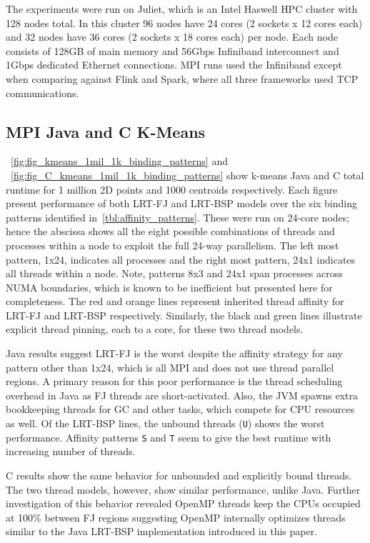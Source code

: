 \documentclass[10pt, conference, compsocconf]{IEEEtran}
\begin{document}
The experiments were run on Juliet, which is an Intel Haswell \ac{HPC} cluster with 128 nodes total. In this cluster 96 nodes have 24 cores (2 sockets x 12 cores each) and 32 nodes have 36 cores (2 sockets x 18 cores each) per node. Each node consists of 128GB of main memory and 56Gbps Infiniband interconnect and 1Gbps dedicated Ethernet connections. \ac{MPI} runs used the Infiniband except when comparing against Flink and Spark, where all three frameworks used \ac{TCP} communications.

\subsection{MPI Java and C K-Means}
\figurename~\ref{fig:fig_kmeans_1mil_1k_binding_patterns} and \figurename~\ref{fig:fig_C_kmeans_1mil_1k_binding_patterns} show k-means Java and C total runtime for 1 million 2D points and 1000 centroids respectively. Each figure present performance of both \ac{LRT-FJ} and \ac{LRT-BSP} models over the six binding patterns identified in~\ref{tbl:affinity_patterns}. These were run on 24-core nodes; hence the abscissa shows all the eight possible combinations of threads and processes within a node to exploit the full 24-way parallelism. The left most pattern, 1x24, indicates all processes and the right most pattern, 24x1 indicates all threads within a node. Note, patterns 8x3 and 24x1 span processes across \ac{NUMA} boundaries, which is known to be inefficient but presented here for completeness. The red and orange lines represent inherited thread affinity for \ac{LRT-FJ} and \ac{LRT-BSP} respectively. Similarly, the black and green lines illustrate explicit thread pinning, each to a core, for these two thread models. 

Java results suggest \ac{LRT-FJ} is the worst despite the affinity strategy for any pattern other than 1x24, which is all \ac{MPI} and does not use thread parallel regions. A primary reason for this poor performance is the thread scheduling overhead in Java as \ac{FJ} threads are short-activated. Also, the \ac{JVM} spawns extra bookkeeping threads for \ac{GC} and other tasks, which compete for \acs{CPU} resources as well. Of the \ac{LRT-BSP} lines, the unbound threads (\texttt{U}) shows the worst performance. Affinity patterns \texttt{S} and \texttt{T} seem to give the best runtime with increasing number of threads. 

C results show the same behavior for unbounded and explicitly bound threads. The two thread models, however, show similar performance, unlike Java. Further investigation of this behavior revealed OpenMP threads keep the \acsp{CPU} occupied at 100\% between \ac{FJ} regions suggesting OpenMP internally optimizes threads similar to the Java \ac{LRT-BSP} implementation introduced in this paper.
\end{document}
